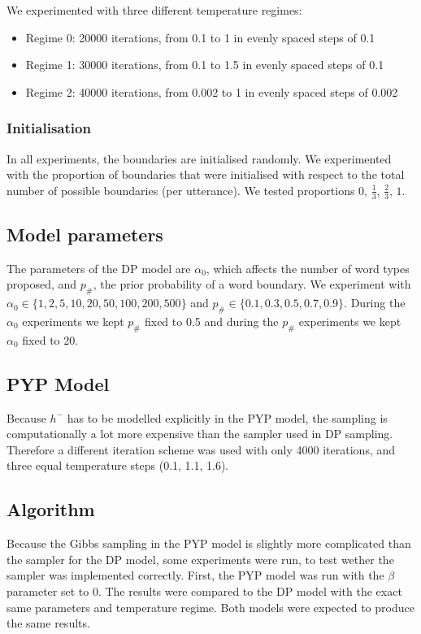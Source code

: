 We experimented with three different temperature regimes:

\begin{itemize}
\item Regime 0: 20000 iterations, from 0.1 to 1 in evenly spaced steps of 0.1
\item Regime 1: 30000 iterations, from 0.1 to 1.5 in evenly spaced steps of 0.1
\item Regime 2: 40000 iterations, from 0.002 to 1 in evenly spaced steps of 0.002
\end{itemize}

\subsubsection{Initialisation}

In all experiments, the boundaries are initialised randomly. We experimented with the proportion of boundaries that were initialised with respect to the total number of possible boundaries (per utterance). We tested proportions $0$, $\frac{1}{3}$, $\frac{2}{3}$, $1$.

\subsection{Model parameters}

The parameters of the DP model are $\alpha_0$, which affects the number of word types proposed, and $p_\#$, the prior probability of a word boundary. We experiment with $\alpha_0 \in \{1, 2, 5, 10, 20, 50, 100, 200, 500\}$ and $p_\# \in \{0.1, 0.3, 0.5, 0.7, 0.9\}$. During the $\alpha_0$ experiments we kept $p_\#$ fixed to 0.5 and during the $p_\#$ experiments we kept $\alpha_0$ fixed to 20.

\subsection{PYP Model}

Because $h^{-}$ has to be modelled explicitly in the PYP model, the sampling is computationally a lot more expensive than the sampler used in DP sampling. Therefore a different iteration scheme was used with only 4000 iterations, and three equal temperature steps (0.1, 1.1, 1.6).

\subsection{Algorithm}
Because the Gibbs sampling in the PYP model is slightly more complicated than the sampler for the DP model, some experiments were run, to test wether the sampler was implemented correctly.
First, the PYP model was run with the $\beta$ parameter set to 0. The results were compared to the DP model with the exact same parameters and temperature regime. Both models were expected to produce the same results.

